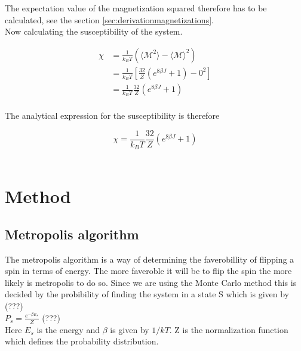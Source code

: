 \documentclass{article}
\begin{document}
The expectation value of the magnetization squared therefore has to be calculated, see the section \ref{sec:derivationmagnetizations}. \\

Now calculating the susceptibility of the system.

\begin{align*}
    \chi &= \frac{1}{k_B T} \left( \langle \mathcal{M}^2 \rangle - \langle \mathcal{M} \rangle ^2 \right) \\
    &= \frac{1}{k_B T} \left[ \frac{32}{Z} \left( e^{8 \beta J} + 1 \right) - 0^2 \right] \\
    &= \frac{1}{k_B T} \frac{32}{Z} \left( e^{8 \beta J} + 1 \right) \\
\end{align*}

The analytical expression for the susceptibility is therefore

\begin{equation}    \label{eq:finalsusceptibility}
    \chi = \frac{1}{k_B T} \frac{32}{Z} \left( e^{8 \beta J} + 1 \right)
\end{equation} \\






\vspace{1cm}

\section{Method} \label{sec:Method}


\subsection{Metropolis algorithm}

The metropolis algorithm is a way of determining the faverobillity of flipping a spin in terms of energy. The more faveroble it will be to flip the spin the more likely is metropolis to do so. Since we are using the Monte Carlo method this is decided by the probibility of finding the system in a state S which is given by (???) \\

$P_s = \frac{e^{-\beta E_s}}{Z} $ (???) \\

Here $E_s$ is the energy and $\beta$ is given by $1/kT$. Z is the normalization function which defines the probability distribution. \\
\end{document}
